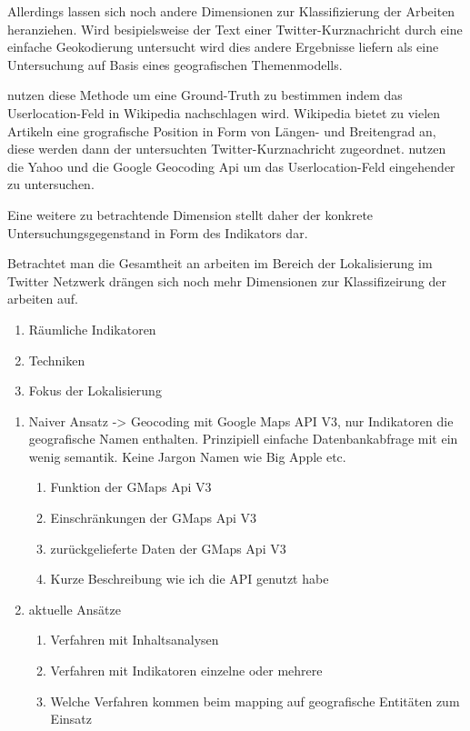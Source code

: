 
		Allerdings lassen sich noch andere Dimensionen zur Klassifizierung der Arbeiten heranziehen. 
		Wird besipielsweise der Text einer Twitter-Kurznachricht durch eine einfache Geokodierung untersucht wird dies andere Ergebnisse liefern als eine Untersuchung auf Basis eines geografischen Themenmodells.  
		

		\cite{Hecht2011} nutzen diese Methode um eine Ground-Truth zu bestimmen indem das Userlocation-Feld in Wikipedia nachschlagen wird. Wikipedia bietet zu vielen Artikeln eine grografische Position in Form von Längen- und Breitengrad an, diese werden dann der untersuchten Twitter-Kurznachricht zugeordnet. 
		\cite{Hale2012} nutzen die Yahoo und die Google Geocoding Api um das Userlocation-Feld eingehender zu untersuchen.  
		

		
		Eine weitere zu betrachtende Dimension stellt daher der konkrete Untersuchungsgegenstand in Form des Indikators dar.


		Betrachtet man die Gesamtheit an arbeiten im Bereich der Lokalisierung im Twitter Netzwerk drängen sich noch mehr Dimensionen zur Klassifizeirung der arbeiten auf.

		\begin{enumerate}
		 	\item Räumliche Indikatoren
		 	\item Techniken
		 	\item Fokus der Lokalisierung
		 \end{enumerate} 	



		

		\begin{enumerate}
			\item Naiver Ansatz -> Geocoding mit Google Maps API V3, nur Indikatoren die geografische Namen enthalten. 
					Prinzipiell einfache Datenbankabfrage mit ein wenig semantik. 
					Keine Jargon Namen wie Big Apple etc.
				\begin{enumerate}
					\item Funktion der GMaps Api V3
					\item Einschränkungen der GMaps Api V3
					\item zurückgelieferte Daten der GMaps Api V3
					\item Kurze Beschreibung wie ich die API genutzt habe
				\end{enumerate}
			\item aktuelle Ansätze
				\begin{enumerate}
					\item Verfahren mit Inhaltsanalysen
					\item Verfahren mit Indikatoren einzelne oder mehrere
					\item Welche Verfahren kommen beim mapping auf  geografische Entitäten zum Einsatz
				\end{enumerate}
		\end{enumerate}

